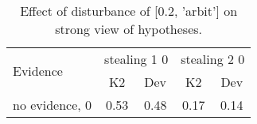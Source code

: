 \begin{table}\begin{tabular}{l|cc|cc}\toprule\multirow{2}{*}{Evidence} & \multicolumn{2}{c}{stealing 1 0}& \multicolumn{2}{c}{stealing 2 0}\\& {K2} & {Dev}& {K2} & {Dev}\\\midrule
no evidence, 0 & \cellcolor{Bittersweet}0.53&\cellcolor{Bittersweet}0.48&0.17&0.14\\\bottomrule\end{tabular}\caption{Effect of disturbance of [0.2, 'arbit'] on strong view of hypotheses.}\end{table}